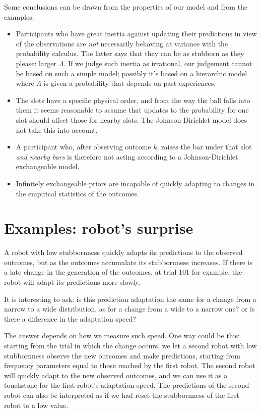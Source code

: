 \documentclass[\ifafour a4paper,12pt,\else a5paper,10pt,\fi%
onecolumn,oneside,article,%
british%
]{memoir}
\theoremstyle{remark}
\theoremstyle{innote}
\renewcommand*{\|}{\mathpunct{|}}
\newcommand*{\yN}{\varLambda}
\begin{document}
Some conclusions can be drawn from the properties of our model and from the
examples:
\begin{itemize}[para]
\item Participants who have great inertia against updating their
  predictions in view of the observations are \emph{not} necessarily
  behaving at variance with the probability calculus. The latter says that
  they can be as stubborn as they please: larger $\yN$. If we judge such
  inertia as irrational, our judgement cannot be based on such a simple
  model; possibly it's based on a hierarchic model where $\yN$ is given a
  probability that depends on past experiences.

\item The slots have a specific physical order, and from the way the ball
  falls into them it seems reasonable to assume that updates to the
  probability for one slot should affect those for nearby slots. The
  Johnson-Dirichlet model does not take this into account. 

\item A participant who, after observing outcome $k$, raises the bar under
  that slot \emph{and nearby bars} is therefore not acting according to a
  Johnson-Dirichlet exchangeable model.
\item Infinitely exchangeable priors are incapable of quickly adapting to
  changes in the empirical statistics of the outcomes.
\end{itemize}


\section{Examples: robot's surprise}
\label{sec:examples_robot_surprise}

A robot with low stubbornness quickly adapts its predictions to the
observed outcomes, but as the outcomes accumulate its stubbornness
increases. If there is a late change in the generation of the outcomes, at
trial 101 for example, the robot will adapt its predictions more slowly.

It is interesting to ask: is this prediction adaptation the same for a
change from a narrow to a wide distribution, as for a change from a wide to
a narrow one? or is there a difference in the adaptation speed?

The answer depends on how we measure such speed. One way could be this:
starting from the trial in which the change occurs, we let a second robot
with low stubbornness observe the new outcomes and make predictions,
starting from frequency parameters equal to those reached by the first
robot. The second robot will quickly adapt to the new observed outcomes,
and we can use it as a touchstone for the first robot's adaptation speed.
The predictions of the second robot can also be interpreted as if we had
reset the stubbornness of the first robot to a low value.
\end{document}
